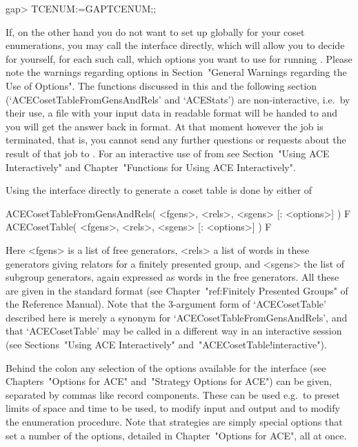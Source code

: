 \beginexample
gap> TCENUM:=GAPTCENUM;;

\endexample


If, on the other hand you do not want to set up  {\ACE}  globally  for
your coset enumerations, you may call the {\ACE}  interface  directly,
which will allow you to decide for yourself, for each such call, which
options you want to use for running {\ACE}. Please note  the  warnings
regarding options in Section~"General Warnings regarding  the  Use  of
Options". The functions discussed in this and  the  following  section
(`ACECosetTableFromGensAndRels' and `ACEStats')  are  non-interactive,
i.e.~by their use, a file with your  input  data  in  {\ACE}  readable
format will be handed to {\ACE} and you will get the  answer  back  in
{\GAP} format. At that moment however the {\ACE}  job  is  terminated,
that is, you cannot send any further questions or requests  about  the
result of that job to {\ACE}. For an interactive use  of  {\ACE}  from
{\GAP} see Section~"Using ACE  Interactively"  and  Chapter~"Functions
for Using ACE Interactively".

Using the {\ACE} interface directly to generate a coset table is  done
by either of

\>ACECosetTableFromGensAndRels( <fgens>, <rels>, <sgens> [: <options>] ) F
\>ACECosetTable( <fgens>, <rels>, <sgens> [: <options>] ) F

Here <fgens> is a list of free generators, <rels> a list of  words  in
these generators giving relators for a finitely presented  group,  and
<sgens> the list of subgroup generators, again expressed as  words  in
the free generators. All these are given in the standard {\GAP} format
(see Chapter~"ref:Finitely Presented Groups" of the  {\GAP}  Reference
Manual). Note that the 3-argument form  of  `ACECosetTable'  described
here is merely a synonym for `ACECosetTableFromGensAndRels', and  that
`ACECosetTable' may be called in a different  way  in  an  interactive
{\ACE}    session    (see    Sections~"Using    ACE     Interactively"
and~"ACECosetTable!interactive").

Behind the colon any  selection  of  the  options  available  for  the
interface (see Chapters~"Options for ACE"  and~"Strategy  Options  for
ACE") can be given, separated by commas like record components.  These
can be used e.g.~to preset limits of space and time  to  be  used,  to
modify input and output and to modify the enumeration procedure.  Note
that strategies are simply special options that set a  number  of  the
options, detailed in Chapter~"Options for ACE", all at once.

